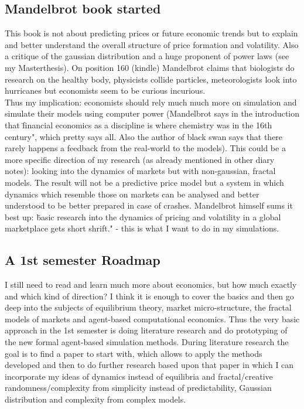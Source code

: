 \subsection*{Mandelbrot book started}
This book is not about predicting prices or future economic trends but to explain and better understand the overall structure of price formation and volatility. Also a critique of the gaussian distribution and a huge proponent of power laws (see my Masterthesis). \bigskip
On position 160 (kindle) Mandelbrot claims that biologists do research on the healthy body, physicists collide particles, meteorologists look into hurricanes but economists seem to be curious incurious. \\
Thus my implication: economists should rely much much more on simulation and simulate their models using computer power (Mandelbrot says in the introduction that \"financial economics as a discipline is where chemistry was in the 16th century", which pretty says all. Also the author of black swan says that there rarely happens a feedback from the real-world to the models). This could be a more specific direction of my research (as already mentioned in other diary notes): looking into the dynamics of markets but with non-gaussian, fractal models. The result will not be a predictive price model but a system in which dynamics which resemble those on markets can be analysed and better understood to be better prepared in case of crashes. Mandelbrot himself sums it best up: \"basic research into the dynamics of pricing and volatility in a global marketplace gets short shrift." - this is what I want to do in my simulations.

\subsection*{A 1st semester Roadmap}
I still need to read and learn much more about economics, but how much exactly and which kind of direction? I think it is enough to cover the basics and then go deep into the subjects of equilibrium theory, market micro-structure, the fractal models of markets and agent-based computational economics. Thus the very basic approach in the 1st semester is doing literature research and do prototyping of the new formal agent-based simulation methods. During literature research the goal is to find a paper to start with, which allows to apply the methods developed and then to do further research based upon that paper in which I can incorporate my ideas of dynamics instead of equilibria and fractal/creative randomness/complexity from simplicity instead of predictability, Gaussian distribution and complexity from complex models.

